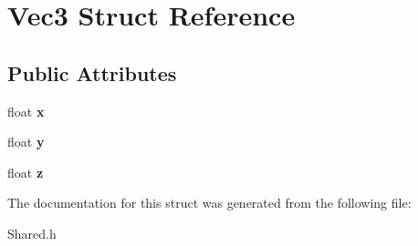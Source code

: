 \hypertarget{structVec3}{
\section{Vec3 Struct Reference}
\label{structVec3}
}
\subsection*{Public Attributes}
\begin{DoxyCompactItemize}
\item 
\hypertarget{structVec3_a2814580e9b9372738c0a61197ea46b51}{
float {\bfseries x}}
\label{structVec3_a2814580e9b9372738c0a61197ea46b51}

\item 
\hypertarget{structVec3_abc1d241232cb04aa98217a942402ae68}{
float {\bfseries y}}
\label{structVec3_abc1d241232cb04aa98217a942402ae68}

\item 
\hypertarget{structVec3_a64f3f00cd2dd9076999eeb2f05210388}{
float {\bfseries z}}
\label{structVec3_a64f3f00cd2dd9076999eeb2f05210388}

\end{DoxyCompactItemize}


The documentation for this struct was generated from the following file:\begin{DoxyCompactItemize}
\item 
Shared.h\end{DoxyCompactItemize}
